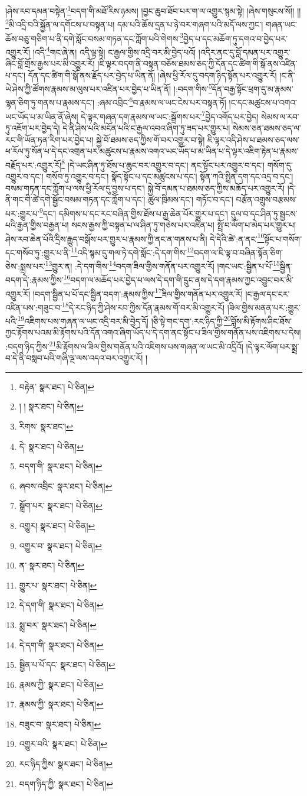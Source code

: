 །ཤེས་རབ་དམན་བསྟེན་\footnote{བརྟེན་  སྣར་ཐང་།  པེ་ཅིན། }བདག་གི་མཐོ་རིས་ཉམས། །བྱང་ཆུབ་ཐོབ་པར་ག་ལ་འགྱུར་སྙམ་སྟེ། །ཞེས་གསུངས་སོ།། །།\footnote{། །  སྣར་ཐང་།  པེ་ཅིན། }མི་འདྲི་བའི་སྐྱོན་ལ་དགོངས་པ་བསྟན་པ། དམ་པའི་ཆོས་དྲན་པ་ཉེ་བར་གཞག་པའི་མདོ་ལས་ཀྱང་། གཞན་ཡང་ཆོས་བཅུ་གཅིག་པ་ནི་དགེ་སློང་བསམ་གཏན་དང་ཀློག་པའི་གེགས་\footnote{རིགས་  སྣར་ཐང་། }བྱེད་པ་དང་མཆོག་ཏུ་དགའ་བ་བྱེད་པར་འགྱུར་རོ། །འདི་\footnote{དེ་  སྣར་ཐང་།  པེ་ཅིན། }གང་ཞེ་ན། འདི་ལྟ་སྟེ། ང་རྒྱལ་གྱིས་འདྲི་བར་མི་བྱེད་པའོ། །འདིར་ནང་དུ་བློ་དམན་པར་འགྱུར་ཞིང་བློ་གྲོས་རྒྱས་པར་མི་འགྱུར་རོ། །ཇི་ལྟར་བདག་ནི་བསྟན་བཅོས་ཐམས་ཅད་ཀྱི་དོན་དང་ཚིག་གི་སྒོ་ནས་འཛིན་པ་དང་། དོན་དང་ཚིག་གི་སྒོ་ནས་རྗོད་པར་བྱེད་པ་ཡིན་ནོ། །ཞེས་ཕྱི་རོལ་དུ་བདག་ཉིད་སྟོན་པར་འགྱུར་རོ། །ང་ནི་ཡེ་ཤེས་ཀྱི་ཚོགས་རྣམས་མ་ལུས་པར་འཛིན་པར་བྱེད་པ་ཡིན་ནོ། །:བདག་གིས་\footnote{བདག་གི་  སྣར་ཐང་།  པེ་ཅིན། }དོན་བརྒྱ་སྟོང་ཕྲག་དུ་མ་རྣམས་ལྷན་ཅིག་ཏུ་གནས་པ་རྣམས་དང་། :ཞམ་འབྲིང་\footnote{ཞབས་འབྲིང་  སྣར་ཐང་།  པེ་ཅིན། }བ་རྣམས་ལ་ཡང་ངེས་པར་བསྟན་ཏོ། །ང་དང་མཚུངས་པ་འགའ་ཡང་ཡོད་པ་མ་ཡིན་ནོ་ཞེས། དེ་ལྟར་གཞན་དག་རྣམས་ལ་ཡང་:སྒྲོགས་པར་\footnote{སྒྲོག་པར་  སྣར་ཐང་།  པེ་ཅིན། }བྱེད་འགོད་པར་བྱེད། སེམས་ལ་རབ་ཏུ་འཇོག་པར་བྱེད་དེ། དེ་ནི་ཤེས་པའི་མངོན་པའི་ང་རྒྱལ་འབའ་ཞིག་ཏུ་ཟད་པར་གྱུར་པ། སེམས་ཅན་ཐམས་ཅད་ལ་རང་གི་ཡོན་ཏན་རིག་པར་བྱེད་པ། སྐྱེ་བོ་ཐམས་ཅད་ཀྱིས་གོ་བར་འགྱུར་བ་སྟེ། ཇི་ལྟར་འདི་ཤེས་པ་ཐམས་ཅད་ལས་ཕ་རོལ་ཏུ་སོན་པ་དེ་དང་འགྲན་པར་མཚུངས་པ་རྣམས་འགའ་ཡང་ཡོད་པ་མ་ཡིན་པ་དེ་ལྟར་འཇིག་རྟེན་པ་རྣམས་བརྗོད་པར་:འགྱུར་རོ།\footnote{འགྱུར།  སྣར་ཐང་།  པེ་ཅིན། } །དེ་ཡང་ཤིན་ཏུ་ཐོས་པ་ཆུང་བར་འགྱུར་བ་དང་། ནང་སྟོང་པར་འགྱུར་བ་དང་། གསོག་དུ་འགྱུར་བ་དང་། གསོབ་ཏུ་འགྱུར་བ་དང་། སྣོད་སྟོང་པ་དང་མཚུངས་པ་དང་། སྟོན་ཀའི་སྤྲིན་དག་དང་འདྲ་བ་དང་། བསམ་གཏན་དང་ཀློག་པ་ལས་ཕྱི་རོལ་དུ་བྱས་པ་དང་། སྐྱེ་བོ་དམན་པ་ཐམས་ཅད་ཀྱིས་མཆོད་པར་འགྱུར་རོ། །དེ་ནི་གང་གི་ཚེ་དགེ་སྦྱོང་བསམ་གཏན་དང་ཀློག་པ་དང་། ཚུལ་ཁྲིམས་དང་། གཏོང་བ་དང་། བརྩོན་འགྲུས་བརྩམས་པར་:གྱུར་པ་\footnote{འགྱུར་བ་  སྣར་ཐང་།  པེ་ཅིན། }དང་། དམིགས་པ་དང་རང་བཞིན་གྱིས་ཐོས་པ་རྒྱ་ཆེན་པོར་གྱུར་པ་དང་། དུལ་བ་དང་ཤིན་ཏུ་སྦྱངས་པའི་རྒྱན་གྱིས་བརྒྱན་པ། སངས་རྒྱས་ཀྱི་བསྟན་པ་ལ་ཤིན་ཏུ་གཅེས་པར་འཛིན་པ། སྤྲོ་བ་ལོག་པ་མེད་པར་གྱུར་པ། ཤེས་རབ་ཆེན་པོའི་དྲིས་རྒྱུད་བསྒོས་པར་གྱུར་པ་རྣམས་ཀྱི་ནང་ན་གནས་པ་ནི། དེ་དེའི་ཚེ་:ན་ནང་\footnote{ན་  སྣར་ཐང་།  པེ་ཅིན། }སྟོང་པ་གསོག་དང་གསོབ་ཏུ་:གྱུར་པ་ནི་\footnote{གྱུར་པ་  སྣར་ཐང་།  པེ་ཅིན། }འདི་སྙམ་དུ་གལ་ཏེ་དགེ་སློང་:དེ་དག་གིས་\footnote{དེ་དག་གི་  སྣར་ཐང་།  པེ་ཅིན། }བདག་ལ་ཇི་ལྟ་བ་བཞིན་སྟོན་ཅིག་ཅེས་:སྨྲས་པར་\footnote{སྨྲ་བར་  སྣར་ཐང་།  པེ་ཅིན། }གྱུར་ན། :དེ་དག་གིས་\footnote{དེ་དག་གི་  སྣར་ཐང་།  པེ་ཅིན། }བདག་ཟིལ་གྱིས་གནོན་པར་འགྱུར་རོ། །གང་ཡང་:སྦྱིན་པ་པོ་\footnote{སྦྱིན་པ་པོ་དང་  སྣར་ཐང་།  པེ་ཅིན། }སྦྱིན་བདག་དེ་:རྣམས་ཀྱིས་\footnote{རྣམས་ཀྱི་  སྣར་ཐང་།  པེ་ཅིན། }བདག་ལ་མཆོད་པར་བྱེད་པ་ལས་དེ་དག་གི་དྲུང་ནས་དེ་དག་རྣམས་ཀྱང་འབྱུང་བར་མི་འགྱུར་རོ། །བདག་སྦྱིན་པ་པོ་དང་སྦྱིན་བདག་:རྣམས་ཀྱིས་\footnote{རྣམས་ཀྱི་  སྣར་ཐང་།  པེ་ཅིན། }ཟིལ་གྱིས་གནོན་པར་འགྱུར་རོ། །ང་རྒྱལ་དང་ངར་འཛིན་པས་:གཟུང་བ་\footnote{བཟུང་བ་  སྣར་ཐང་།  པེ་ཅིན། }དེ་རང་ཉིད་ཀྱི་ཤེས་རབ་ཀྱིས་དོན་རྣམས་གོ་བར་མི་འགྱུར་རོ། །ཟིལ་གྱིས་མནན་པར་:གྱུར་པའི་\footnote{འགྱུར་བའི་  སྣར་ཐང་།  པེ་ཅིན། }འཇིགས་པས་གཞན་ལ་ཡང་འདྲི་བར་མི་བྱེད་དོ། །ཅི་སྟེ་གང་དག་:རང་ཉིད་ཀྱི་\footnote{རང་ཉིད་ཀྱིས་  སྣར་ཐང་།  པེ་ཅིན། }བློས་མི་རྟོགས་ཤིང་ཐོས་ཀྱང་རྟོགས་པའམ་མི་རྟོགས་པའི་དོན་འགའ་ཞིག་ཡོད་པ་དེ་དག་ནང་སྟོང་པ་ཟིལ་གྱིས་གནོན་པས་འཇིགས་པ་དེས། :བདག་ཉིད་ཀྱིས་\footnote{བདག་ཉིད་ཀྱི་  སྣར་ཐང་།  པེ་ཅིན། }མི་རྟོགས་ལ་ཟིལ་གྱིས་གནོན་པའི་འཇིགས་པས་གཞན་ལ་ཡང་མི་འདྲིའོ། །དེ་ལྟར་ལོག་པར་སྨྲ་བ་དེ་ནི་བསླབ་པའི་གཞི་ལྔ་ལས་འདའ་བར་འགྱུར་རོ། །
